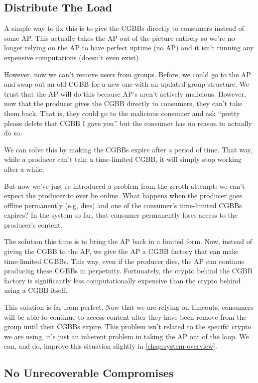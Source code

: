 \documentclass[pdftex,12pt,a4papaer,twoside,notitlepage]{report}
\begin{document}
\subsection{Distribute The Load}

A simple way to fix this is to give the CGBBs directly to consumers instead of
some AP. This actually takes the AP out of the picture entirely so we're no
longer relying on the AP to have perfect uptime (no AP) and it isn't running any
expensive computations (doesn't even exist).

However, now we can't remove users from groups. Before, we could go to the AP
and swap out an old CGBB for a new one with an updated group structure. We trust
that the AP will do this because AP's aren't actively malicious. However, now
that the producer gives the CGBB directly to consumers, they can't take them
back. That is, they could go to the malicious consumer and ask ``pretty please
delete that CGBB I gave you'' but the consumer has no reason to actually do so.

We can solve this by making the CGBBs expire after a period of time. That way,
while a producer can't take a time-limited CGBB, it will simply stop working
after a while.

But now we've just re-introduced a problem from the zeroth attempt: we can't
expect the producer to ever be online. What happens when the producer goes
offline permanently (e.g, dies) and one of the consumer's time-limited CGBBs
expires? In the system so far, that consumer permanently loses access to the
producer's content.

The solution this time is to bring the AP back in a limited form. Now, instead
of giving the CGBB to the AP, we give the AP a CGBB factory that can make
time-limited CGBBs. This way, even if the producer dies, the AP can continue
producing these CGBBs in perpetuity. Fortunately, the crypto behind the CGBB
factory is significantly less computationally expensive than the crypto behind
using a CGBB itself.

This solution is far from perfect. Now that we are relying on timeouts,
consumers will be able to continue to access content after they have been remove
from the group until their CGBBs expire. This problem isn't related to the
specific crypto we are using, it's just an inherent problem in taking the AP out
of the loop. We can, and do, improve this situation slightly in
\cref{chap:system-overview}.

\subsection{No Unrecoverable Compromises}
\end{document}
